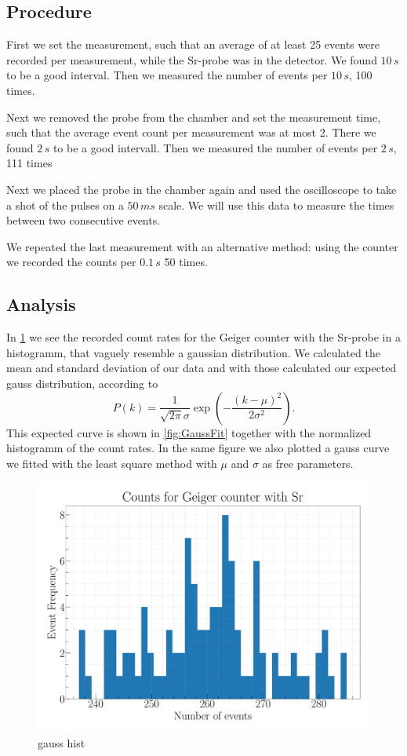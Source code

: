 \subsection{Procedure}

First we set the measurement, such that an average of at least 25 events were recorded per measurement, while the Sr-probe was in the detector. We found $10\,s$ to be a good interval. Then we measured the number of events per $10\,s$, 100 times.

Next we removed the probe from the chamber and set the measurement time, such that the average event count per measurement was at most 2. There we found $2\,s$ to be a good intervall. Then we measured the number of events per $2\,s$, 111 times

Next we placed the probe in the chamber again and used the oscilloscope to take a shot of the pulses on a $50\,ms$ scale. We will use this data to measure the times between two consecutive events.

We repeated the last measurement with an alternative method: using the counter we recorded the counts per $0.1\,s$ 50 times.

\subsection{Analysis}

In \cref{fig:GaussHist} we see the recorded count rates for the Geiger counter with the Sr-probe in a histogramm, that vaguely resemble a gaussian distribution. We calculated the mean and standard deviation of our data and with those calculated our expected gauss distribution, according to
\begin{equation}
P(k) = \frac{1}{\sqrt{2\pi}\sigma} \exp(-\frac{(k-\mu)^2}{2\sigma^2}).
\end{equation}
This expected curve is shown in \cref{fig:GaussFit} together with the normalized histogramm of the count rates. In the same figure we also plotted a gauss curve we fitted with the least square method with $\mu$ and $\sigma$ as free parameters.

\begin{figure}[H]
\centering
\includegraphics[width=\textwidth]{../Figures/Geiger_gauss_histogram.pdf}
\caption{gauss hist}
\label{fig:GaussHist}
\end{figure}

